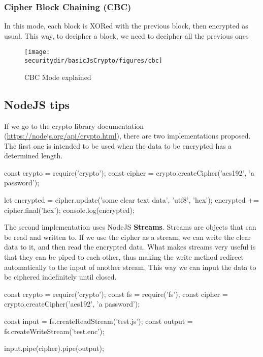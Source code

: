 \subsubsection{Cipher Block Chaining (CBC)}	

In this mode, each block is XORed with the previous block, then encrypted as usual. This way, to decipher a block, we need to decipher all the previous ones

\begin{figure}[htb]
	\begin{centering}
		\texttt{[image: \\securitydir/basicJsCrypto/figures/cbc]}
		\par\end{centering}
	\caption{\label{fig:cbc} CBC Mode explained}
\end{figure}

\subsection{NodeJS tips}
If we go to the crypto library documentation (\url{https://nodejs.org/api/crypto.html}), there are two implementations proposed. The first one is intended to be used when the data to be encrypted has a determined length.

\begin{js}
const crypto = require('crypto');
const cipher = crypto.createCipher('aes192', 'a password');

let encrypted = cipher.update('some clear text data', 'utf8', 'hex');
encrypted += cipher.final('hex');
console.log(encrypted);
\end{js}

The second implementation uses NodeJS \textbf{Streams}. Streams are objects that can be read and written to. If we use the cipher as a stream, we can write the clear data to it, and then read the encrypted data. What makes streams very useful is that they can be piped to each other, thus making the write method redirect automatically to the input of another stream. This way we can input the data to be ciphered indefinitely until closed.

\begin{js}
const crypto = require('crypto');
const fs = require('fs');
const cipher = crypto.createCipher('aes192', 'a password');

const input = fs.createReadStream('test.js');
const output = fs.createWriteStream('test.enc');

input.pipe(cipher).pipe(output);
\end{js}